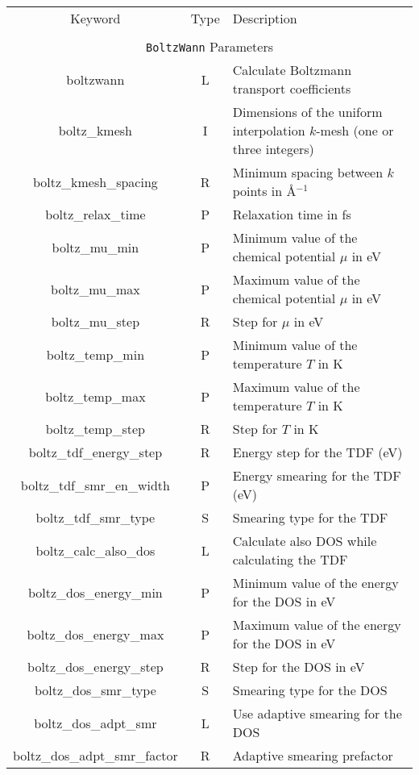 \begin{table}[hH!]
\begin{center}
\begin{tabular}{|c|c|p{6cm}|}
\hline
Keyword & Type & Description \\
        &      &             \\
\hline\hline
\multicolumn{3}{|c|}{{\tt BoltzWann} Parameters} \\
\hline
{\sc boltzwann}   & L & Calculate Boltzmann transport coefficients \\
{\sc boltz\_kmesh} & I & Dimensions of the uniform interpolation 
$k$-mesh (one or three integers)\\ 
{\sc boltz\_kmesh\_spacing} & R & Minimum spacing between $k$ points in \AA$^{-1}$\\
{\sc boltz\_relax\_time} & P & Relaxation time in fs\\
{\sc boltz\_mu\_min} & P & Minimum value of the chemical potential $\mu$ in eV\\
{\sc boltz\_mu\_max} & P & Maximum value of the chemical potential $\mu$ in eV\\
{\sc boltz\_mu\_step} & R & Step for $\mu$ in eV\\
{\sc boltz\_temp\_min} & P & Minimum value of the temperature $T$ in K \\
{\sc boltz\_temp\_max} & P & Maximum value of the temperature $T$ in K \\
{\sc boltz\_temp\_step} & R & Step for $T$ in K \\
{\sc boltz\_tdf\_energy\_step} & R & Energy step for the TDF (eV) \\
{\sc boltz\_tdf\_smr\_en\_width} & P & Energy smearing for the TDF (eV) \\
{\sc boltz\_tdf\_smr\_type} & S & Smearing type for the TDF \\
{\sc boltz\_calc\_also\_dos} & L & Calculate also DOS while calculating the TDF\\
{\sc boltz\_dos\_energy\_min} & P & Minimum value of the energy for the DOS in eV \\
{\sc boltz\_dos\_energy\_max} & P & Maximum value of the energy for the DOS in eV \\
{\sc boltz\_dos\_energy\_step} & R & Step for the DOS in eV\\
{\sc boltz\_dos\_smr\_type} & S & Smearing type for the DOS \\
{\sc boltz\_dos\_adpt\_smr} & L & Use adaptive smearing for the DOS \\
{\sc boltz\_dos\_adpt\_smr\_factor} & R & Adaptive smearing prefactor\\

\end{tabular}
\end{center}
\end{table}
